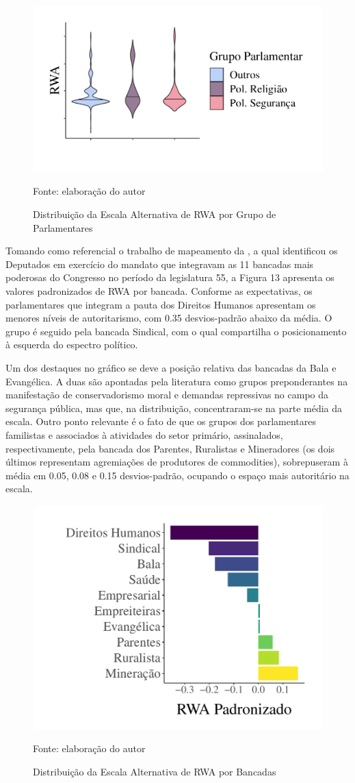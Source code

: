 \documentclass[
12pt,				%
openright,			%
twoside,			%
a4paper,			%
english,			%
french,				%
spanish,			%
brazil				%
]{abntex2}
\begin{document}
\begin{figure}[h]
	\caption{Distribuição da Escala Alternativa de RWA por Grupo de Parlamentares}
	\label{fig:rwa_grupos}
	\centering
	\includegraphics[width=.7\linewidth]{figures/rwa_grupos}
	
	Fonte: elaboração do autor	
\end{figure}

Tomando como referencial o trabalho de mapeamento da , a qual identificou os Deputados em exercício do mandato que integravam as 11 bancadas mais poderosas do Congresso no período da legislatura 55, a Figura 13 apresenta os valores padronizados de RWA por bancada. Conforme as expectativas, os parlamentares que integram a pauta dos Direitos Humanos apresentam os menores níveis de autoritarismo, com 0.35 desvios-padrão abaixo da média. O grupo é seguido pela bancada Sindical, com o qual compartilha o posicionamento à esquerda do espectro político.

Um dos destaques no gráfico se deve a posição relativa das bancadas da Bala e Evangélica. A duas são apontadas pela literatura como grupos preponderantes na manifestação de conservadorismo moral e demandas repressivas no campo da segurança pública, mas que, na distribuição, concentraram-se na parte média da escala. Outro ponto relevante é o fato de que os grupos dos parlamentares familistas e associados à atividades do setor primário, assinalados, respectivamente, pela bancada dos Parentes, Ruralistas e Mineradores (os dois últimos representam agremiações de produtores de commodities), sobrepuseram à média em 0.05, 0.08 e 0.15 desvios-padrão, ocupando o espaço mais autoritário na escala.
  
\begin{figure}[h]
	\caption{Distribuição da Escala Alternativa de RWA por Bancadas}
	\label{fig:rwa_bancadas}
	\centering
	\includegraphics[width=.6\linewidth]{figures/rwa_bancadas}
	
	Fonte: elaboração do autor	
\end{figure}
\end{document}
